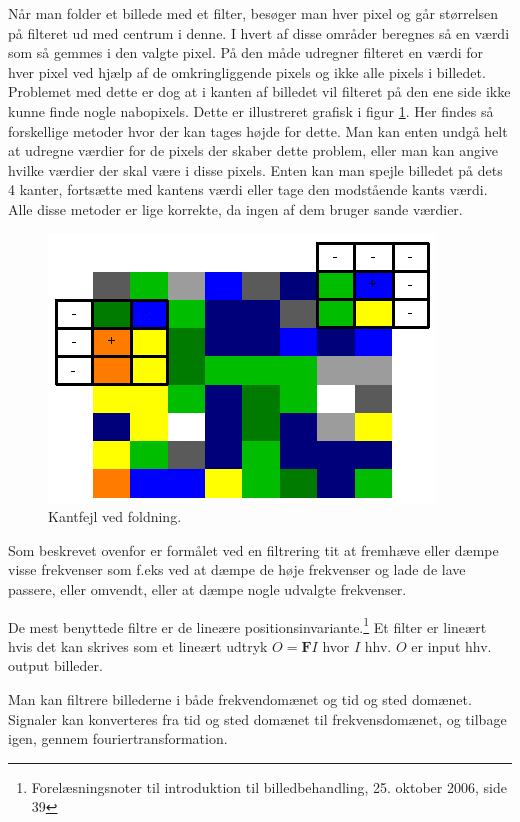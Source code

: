 Når man folder et billede med et filter, besøger man hver pixel og går størrelsen på filteret ud med centrum i denne. I hvert af disse områder beregnes så en værdi som så gemmes i den valgte pixel. På den måde udregner filteret en værdi for hver pixel ved hjælp af de omkringliggende pixels og ikke alle pixels i billedet. Problemet med dette er dog at i kanten af billedet vil filteret på den ene side ikke kunne finde nogle nabopixels. Dette er illustreret grafisk i figur \ref{fig:bildbeh_conv_edge_error}. Her findes så forskellige metoder hvor der kan tages højde for dette. Man kan enten undgå helt at udregne værdier for de pixels der skaber dette problem, eller man kan angive hvilke værdier der skal være i disse pixels. Enten kan man spejle billedet på dets 4 kanter, fortsætte med kantens værdi eller tage den modstående kants værdi. Alle disse metoder er lige korrekte, da ingen af dem bruger sande værdier. 

\begin{figure}[H]
	\centering
	\includegraphics[scale=0.5]{files/bildbeh/img/conv_edge_error.png}
	\caption{Kantfejl ved foldning.\label{fig:bildbeh_conv_edge_error}}
\end{figure}

Som beskrevet ovenfor er formålet ved en filtrering tit at fremhæve eller dæmpe visse frekvenser som f.eks ved at dæmpe de høje frekvenser og lade de lave passere, eller omvendt, eller at dæmpe nogle udvalgte frekvenser. 

De mest benyttede filtre er de lineære positionsinvariante.\footnote{Forelæsningsnoter til introduktion til billedbehandling, 25. oktober 2006, side 39} Et filter er lineært hvis det kan skrives som et lineært udtryk $O=\mathbf{F}I$ hvor $I$ hhv. $O$ er input hhv. output billeder. 

Man kan filtrere billederne i både frekvendomænet og tid og sted domænet. Signaler kan konverteres fra tid og sted domænet til frekvensdomænet, og tilbage igen, gennem fouriertransformation.

